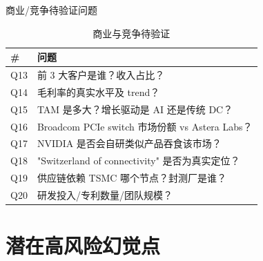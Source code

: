 \documentclass[UTF8,11pt,aspectratio=169]{beamer}
\begin{document}
\begin{frame}{商业/竞争待验证问题}
    \begin{table}
        \centering
        \caption{商业与竞争待验证}
        \begin{tabular}{lp{}}
            \toprule
            \textbf{\#} & \textbf{问题} \\
            \midrule
            Q13 & 前 3 大客户是谁？收入占比？\\
            Q14 & 毛利率的真实水平及 trend？\\
            Q15 & TAM 是多大？增长驱动是 AI 还是传统 DC？\\
            Q16 & Broadcom PCIe switch 市场份额 vs Astera Labs？\\
            Q17 & NVIDIA 是否会自研类似产品吞食该市场？\\
            Q18 & "Switzerland of connectivity" 是否为真实定位？\\
            Q19 & 供应链依赖 TSMC 哪个节点？封测厂是谁？\\
            Q20 & 研发投入/专利数量/团队规模？\\
            \bottomrule
        \end{tabular}
    \end{table}
\end{frame}

\section{潜在高风险幻觉点}
\end{document}
